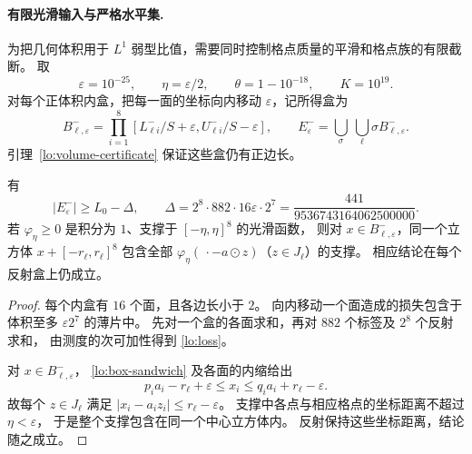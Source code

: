 \paragraph{有限光滑输入与严格水平集.}
为把几何体积用于 $L^1$ 弱型比值，需要同时控制格点质量的平滑和格点族的有限截断。
取
\begin{equation}\label{lo:finite-parameters}
 \varepsilon=10^{-25},\qquad \eta=\varepsilon/2,\qquad
 \theta=1-10^{-18},\qquad K=10^{19}.
\end{equation}
对每个正体积内盒，把每一面的坐标向内移动 $\varepsilon$，记所得盒为
\[
 B_{\ell,\varepsilon}^-
 =\prod_{i=1}^8
 [L_{\ell i}^-/S+\varepsilon,U_{\ell i}^-/S-\varepsilon],
 \qquad
 E_\varepsilon^-=\bigcup_\sigma\ \bigcup_\ell\sigma B_{\ell,\varepsilon}^-.
\]
引理~\ref{lo:volume-certificate} 保证这些盒仍有正边长。

\begin{lemma}\label{lo:smoothing-loss}
有
\begin{equation}\label{lo:loss}
 |E_\varepsilon^-|\ge L_0-\Delta,\qquad
 \Delta=2^8\cdot882\cdot16\varepsilon\cdot2^7
       =\frac{441}{9536743164062500000}.
\end{equation}
若 $\varphi_\eta\ge0$ 是积分为 $1$、支撑于 $[-\eta,\eta]^8$ 的光滑函数，
则对 $x\in B_{\ell,\varepsilon}^-$，同一个立方体
$x+[-r_\ell,r_\ell]^8$ 包含全部
$\varphi_\eta(\,\cdot-a\odot z)$（$z\in J_\ell$）的支撑。
相应结论在每个反射盒上仍成立。
\end{lemma}

\begin{proof}
每个内盒有 $16$ 个面，且各边长小于 $2$。
向内移动一个面造成的损失包含于体积至多 $\varepsilon2^7$ 的薄片中。
先对一个盒的各面求和，再对 $882$ 个标签及 $2^8$ 个反射求和，
由测度的次可加性得到 \eqref{lo:loss}。

对 $x\in B_{\ell,\varepsilon}^-$，
\eqref{lo:box-sandwich} 及各面的内缩给出
\[
 p_i a_i-r_\ell+\varepsilon\le x_i
 \le q_i a_i+r_\ell-\varepsilon.
\]
故每个 $z\in J_\ell$ 满足
$|x_i-a_i z_i|\le r_\ell-\varepsilon$。
支撑中各点与相应格点的坐标距离不超过 $\eta<\varepsilon$，
于是整个支撑包含在同一个中心立方体内。
反射保持这些坐标距离，结论随之成立。
\end{proof}

